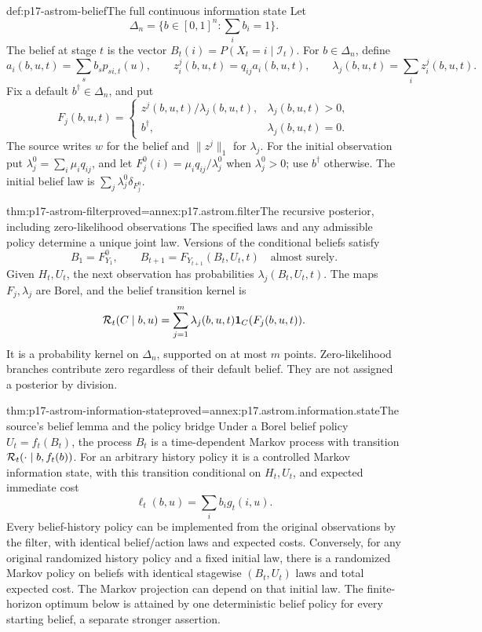 \begin{hbdefinition}{def:p17-astrom-belief}{The full continuous information state}
Let
\[
 \Delta_n=\{b\in[0,1]^n:\textstyle\sum_i b_i=1\}.
\]
The belief at stage \(t\) is the vector
\(B_t(i)=P(X_t=i\mid\mathcal I_t)\).
For \(b\in\Delta_n\), define
\[
 a_i(b,u,t)=\sum_s b_s p_{si,t}(u),\qquad
 z_i^j(b,u,t)=q_{ij}a_i(b,u,t),\qquad
 \lambda_j(b,u,t)=\sum_i z_i^j(b,u,t).
\]
Fix a default \(b^\dagger\in\Delta_n\), and put
\[
 F_j(b,u,t)=
 \begin{cases}
 z^j(b,u,t)/\lambda_j(b,u,t),&\lambda_j(b,u,t)>0,\\
 b^\dagger,&\lambda_j(b,u,t)=0.
 \end{cases}
\]
The source writes \(w\) for the belief and
\(\|z^j\|_1\) for \(\lambda_j\).
For the initial observation put
\(\lambda_j^0=\sum_i\mu_iq_{ij}\), and let
\(F_j^0(i)=\mu_iq_{ij}/\lambda_j^0\) when \(\lambda_j^0>0\);
use \(b^\dagger\) otherwise.
The initial belief law is
\(\sum_j\lambda_j^0\delta_{F_j^0}\).
\end{hbdefinition}

\begin{hbtheorem}{thm:p17-astrom-filter}{proved=annex:p17.astrom.filter}{The recursive posterior, including zero-likelihood observations}
The specified laws and any admissible policy determine a unique
joint law. Versions of the conditional beliefs satisfy
\[
 B_1=F_{Y_1}^0,\qquad B_{t+1}=F_{Y_{t+1}}(B_t,U_t,t)
                         \quad\text{almost surely}.
\]
Given \(H_t,U_t\), the next observation has probabilities
\(\lambda_j(B_t,U_t,t)\).
The maps \(F_j,\lambda_j\) are Borel, and the belief transition
kernel is
\[
 {\cal R}_t(C\mid b,u)=
              \sum_{j=1}^m\lambda_j(b,u,t)\mathbf1_C(F_j(b,u,t)).
\]
It is a probability kernel on \(\Delta_n\), supported on at most
\(m\) points. Zero-likelihood branches contribute zero regardless
of their default belief. They are not assigned a posterior by division.
\end{hbtheorem}

\begin{hbtheorem}{thm:p17-astrom-information-state}{proved=annex:p17.astrom.information.state}{The source's belief lemma and the policy bridge}
Under a Borel belief policy \(U_t=f_t(B_t)\), the process \(B_t\)
is a time-dependent Markov process with transition
\({\cal R}_t(\cdot\mid b,f_t(b))\).
For an arbitrary history policy it is a controlled Markov
information state, with this transition conditional on
\(H_t,U_t\), and expected immediate cost
\[
                        \ell_t(b,u)=\sum_i b_i g_t(i,u).
\]
Every belief-history policy can be implemented from the original
observations by the filter, with identical belief/action laws and
expected costs. Conversely, for any original randomized history
policy and a fixed initial law, there is a randomized Markov
policy on beliefs with identical stagewise \((B_t,U_t)\) laws
and total expected cost.
The Markov projection can depend on that initial law.
The finite-horizon optimum below is attained by one deterministic
belief policy for every starting belief, a separate stronger assertion.
\end{hbtheorem}

